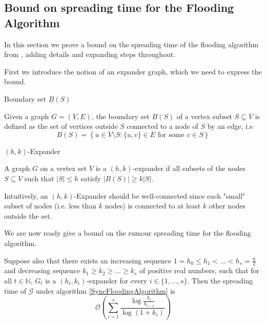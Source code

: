 

\subsection{Bound on spreading time for the Flooding Algorithm}

In this section we prove a bound on the spreading time of the flooding algorithm from \cite{syncPaper}, adding details and expanding steps throughout.

First we introduce the notion of an expander graph, which we need to express the bound.

\begin{definition}
	Boundary set $B(S)$

	\noindent 
	Given a graph $G=(V,E)$, the boundary set $B(S)$ of a vertex subset $S \subseteq V$ is defined as the set of vertices outside $S$ connected to a node of $S$ by an edge, i.e
	$$
		B(S) = \left\{u \in V \setminus S : \{u, v\} \in E \text{ for some } v \in S \right\}
	$$
\end{definition}


\begin{definition}
	$(h, k)$-Expander

	\noindent
	A graph $G$ on a vertex set $V$ is a $(h, k)$-expander if all subsets of the nodes $S \subseteq V$ such that $|S| \leq h$ satisfy $|B(S)| \geq k|S|$.
\end{definition}

Intuitively, an $(h, k)$-Expander should be well-connected since each "small" subset of nodes (i.e. less than $k$ nodes) is connected to at least $k$ other nodes outside the set.  

We are now ready give a bound on the rumour spreading time for the flooding algorithm.

\begin{theorem}\label{theorem:DeterministicFloodingBound}
	\ModelIntro Suppose also that there exists an increasing sequence $1 = h_0 \leq h_1 < \dots < h_s = \frac{n}{2}$ and decreasing sequence $k_1 \geq k_2 \geq \dots \geq k_s$ of positive real numbers, such that for all $t \in \mathbb{N}$, $G_t$ is a $(h_i, k_i)$-expander for every $i \in \{1, \dots , s\}$. Then the spreading time of $\mathcal{G}$ under algorithm \ref{SyncFloodingAlgorithm} is
	$$
		\mathcal{O}\left(\sum_{i=1}^s \frac{\log \frac{h_i}{h_{i-1}}}{\log(1+k_i)}\right)
	$$
\end{theorem}

